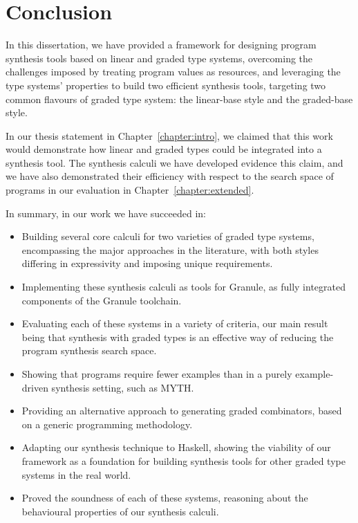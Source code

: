 \chapter{Conclusion}
\label{chapter:conclusion}
In this dissertation, we have provided a framework for designing program
synthesis tools based on linear and graded type systems, overcoming the
challenges imposed by treating program values as resources, and leveraging the
type systems' properties to build two efficient synthesis tools, targeting two
common flavours of graded type system: the linear-base style and the graded-base
style. 

In our thesis statement in Chapter~\ref{chapter:intro}, we claimed that this
work would demonstrate how linear and graded types could be integrated into a
synthesis tool. The synthesis calculi we have developed evidence this claim, and
we have also demonstrated their efficiency with respect to the search space of
programs in our evaluation in Chapter~\ref{chapter:extended}. 

In summary, in our work we have succeeded in: 
\begin{itemize}
    \item Building several core calculi for two varieties of graded type
          systems, encompassing the major approaches in the literature, with
          both styles differing in expressivity and imposing unique
          requirements. 
    \item Implementing these synthesis calculi as tools for Granule, as fully
          integrated components of the Granule toolchain. 
    \item Evaluating each of these systems in a variety of criteria, our main
          result being that synthesis with graded types is an effective way of
          reducing the program synthesis search space.  
    \item Showing that programs require fewer examples than in a purely
          example-driven synthesis setting, such as \textsc{MYTH}. 
    \item Providing an alternative approach to generating graded combinators,
    based on a generic programming methodology. 
    \item Adapting our synthesis technique to Haskell, showing the viability of
          our framework as a foundation for building synthesis tools for other
          graded type systems in the real world.
    \item Proved the soundness of each of these systems, reasoning about the
          behavioural properties of our synthesis calculi. 
\end{itemize}

